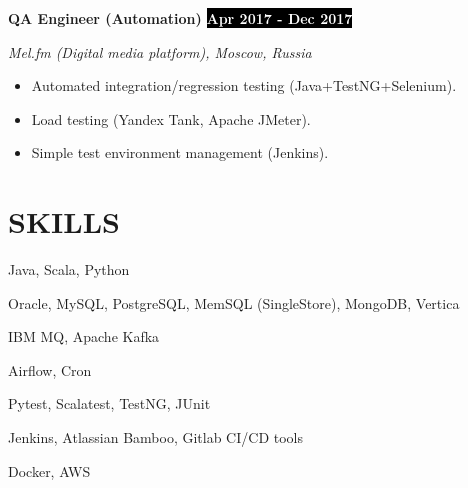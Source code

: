 \documentclass[11pt,a4paper]{article}
\newcommand{\timeperiod}[1]{%
    \hfill{\small\colorbox{black}{\textcolor{white}{\textbf{#1}}}}\par%
}
\newcommand{\jobsep}{\vspace{1.5em}}
\begin{document}
\jobsep
\textbf{QA Engineer (Automation)}\timeperiod{Apr 2017 - Dec 2017}
\textit{Mel.fm (Digital media platform), Moscow, Russia}
\begin{itemize}
    \item Automated integration/regression testing (Java+TestNG+Selenium).
    \item Load testing (Yandex Tank, Apache JMeter).
    \item Simple test environment management (Jenkins).
\end{itemize}

\section{SKILLS}
\begin{description}[labelwidth=1.5cm,leftmargin=!]
    \item[Languages] Java, Scala, Python
    \item[DBs] Oracle, MySQL, PostgreSQL, MemSQL (SingleStore), MongoDB, Vertica
    \item[MQs] IBM MQ, Apache Kafka
    \item[Schedulers] Airflow, Cron
    \item[Testing] Pytest, Scalatest, TestNG, JUnit
    \item[CI/CD tools] Jenkins, Atlassian Bamboo, Gitlab CI/CD tools
    \item[Other] Docker, AWS
\end{description}
\end{document}
